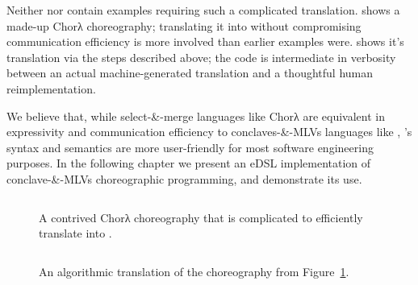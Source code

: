 Neither \cite{chor-lambda} nor \cite{chor-lambda-2} contain examples requiring such a complicated translation.
 shows a made-up Chorλ choreography;
translating it into \HLSCentral without compromising communication efficiency is more involved than earlier examples were.
 shows it's translation via the steps described above;
the code is intermediate in verbosity between an actual machine-generated translation
and a thoughtful human reimplementation.

We believe that, while select-\&-merge languages like Chorλ are equivalent
in expressivity and communication efficiency to conclaves-\&-MLVs languages like \HLSCentral,
\HLSCentral's syntax and semantics are more user-friendly for most software engineering purposes.
In the following chapter we present an eDSL implementation of conclave-\&-MLVs choreographic programming,
and demonstrate its use.

\begin{figure}[tbhp]
    \begin{mdframed}
    \inputminted[xleftmargin=10pt,linenos,fontsize=\scriptsize]{bash}{figures/contrived_lc.txt}
    \caption{A contrived Chorλ choreography that is complicated to efficiently translate into \HLSCentral.}
    \label{fig:chor-lambda-complex}
    \end{mdframed}
\end{figure}

\begin{figure}[tbhp]
    \begin{mdframed}
    \inputminted[xleftmargin=10pt,linenos,fontsize=\scriptsize]{bash}{figures/contrived_hls.txt}
    \caption{An algorithmic \HLSCentral translation of the choreography from Figure~\ref{fig:chor-lambda-complex}.}
    \label{fig:our-complex}
    \end{mdframed}
\end{figure}




